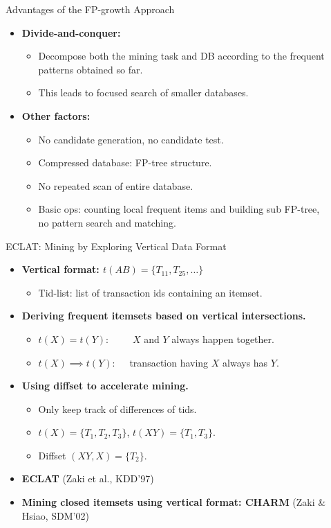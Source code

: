 \begin{frame}{Advantages of the FP-growth Approach}
	\begin{itemize}
		\item \textbf{Divide-and-conquer:}
		      \begin{itemize}
			      \item Decompose both the mining task and DB according
			            to the frequent patterns obtained so far.
			      \item This leads to focused search of smaller databases.
		      \end{itemize}
		\item \textbf{Other factors:}
		      \begin{itemize}
			      \item No candidate generation, no candidate test.
			      \item Compressed database: FP-tree structure.
			      \item No repeated scan of entire database.
			      \item Basic ops: counting local frequent items and building sub
			            FP-tree,\\
			            no pattern search and matching.
		      \end{itemize}
	\end{itemize}
\end{frame}

\begin{frame}{ECLAT: Mining by Exploring Vertical Data Format}
	\begin{itemize}
		\item \textbf{Vertical format: $t(AB) = \{T_{11},T_{25},\ldots\}$}
		      \begin{itemize}
			      \item Tid-list: list of transaction ids containing an itemset.
		      \end{itemize}
		\item \textbf{Deriving frequent itemsets based on vertical
			      intersections.}
		      \begin{itemize}
			      \item $t(X) = t(Y): \qquad$ \hphantom{.} $X$ and $Y$ always happen
			            together.
			      \item $t(X) \implies t(Y):\quad $ transaction having $X$ always has
			            $Y$.
		      \end{itemize}
		\item \textbf{Using diffset to accelerate mining.}
		      \begin{itemize}
			      \item Only keep track of differences of tids.
			      \item $t(X) = \{T_1,T_2,T_3\}$, $t(XY) = \{T_1,T_3\}$.
			      \item Diffset $(XY,X) = \{T_2\}$.
		      \end{itemize}
		\item \textbf{ECLAT} (Zaki et al., KDD'97)
		\item \textbf{Mining closed itemsets using vertical format: CHARM}
		      (Zaki \& Hsiao, SDM'02)
	\end{itemize}
\end{frame}

